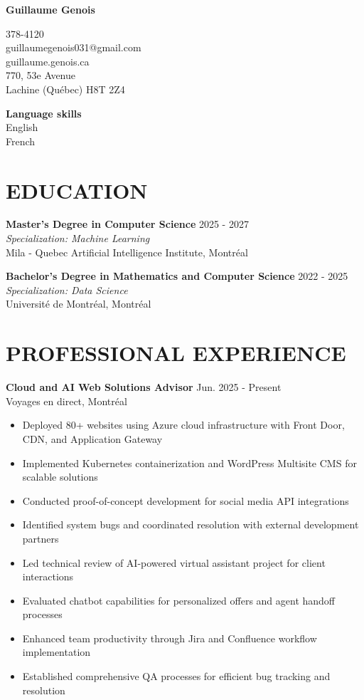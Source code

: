 \documentclass[11pt,a4paper]{article}
\newcommand{\educationitem}[4]{
\noindent
  \textbf{#1} \hfill #2 \\
  \textit{#3} \\
  #4 \vspace{6pt}
}
\newcommand{\experienceitem}[4]{
\noindent
  \textbf{#1} \hfill #2 \\
  #3 \vspace{2pt}
  #4 \vspace{8pt}
}
\begin{document}
\begin{center}
  {\Huge \textbf{Guillaume Genois}} \\[8pt]
\end{center}

 378-4120\\
guillaumegenois031@gmail.com\\
guillaume.genois.ca\\
770, 53e Avenue\\
Lachine (Québec) H8T 2Z4

\vspace{-75pt}
\begin{flushright}
  \textbf{Language skills} \\
  English \\
  French
\end{flushright}

\vspace{15pt}

\section{EDUCATION}
\educationitem{Master's Degree in Computer Science}{2025 - 2027}{Specialization: Machine Learning}{Mila - Quebec Artificial Intelligence Institute, Montréal}

\educationitem{Bachelor's Degree in Mathematics and Computer Science}{2022 - 2025}{Specialization: Data Science}{Université de Montréal, Montréal}

\section{PROFESSIONAL EXPERIENCE}
\experienceitem{Cloud and AI Web Solutions Advisor}{Jun. 2025 - Present}{Voyages en direct, Montréal}{
  \begin{itemize}
    \item Deployed 80+ websites using Azure cloud infrastructure with Front Door, CDN, and Application Gateway
    \item Implemented Kubernetes containerization and WordPress Multisite CMS for scalable solutions
    \item Conducted proof-of-concept development for social media API integrations
    \item Identified system bugs and coordinated resolution with external development partners
    \item Led technical review of AI-powered virtual assistant project for client interactions
    \item Evaluated chatbot capabilities for personalized offers and agent handoff processes
    \item Enhanced team productivity through Jira and Confluence workflow implementation
    \item Established comprehensive QA processes for efficient bug tracking and resolution
  \end{itemize}
}
\end{document}
